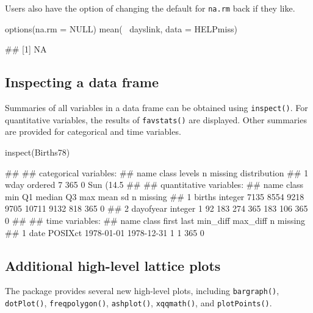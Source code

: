 \noindent
Users also have the option of changing the default for \texttt{na.rm}
back if they like.

\begin{Schunk}
\begin{Sinput}
options(na.rm = NULL)
mean(~ dayslink, data = HELPmiss)
\end{Sinput}
\begin{Soutput}
## [1] NA
\end{Soutput}
\end{Schunk}

\subsection{Inspecting a data frame}\label{inspecting-a-data-frame}

Summaries of all variables in a data frame can be obtained using
\texttt{inspect()}. For quantitative variables, the results of
\texttt{favstats()} are displayed. Other summaries are provided for
categorical and time variables.

\begin{Schunk}
\begin{Sinput}
inspect(Births78)
\end{Sinput}
\begin{Soutput}
## 
## categorical variables:  
##   name   class levels   n missing                                  distribution
## 1 wday ordered      7 365       0 Sun (14.5%
## 
## quantitative variables:  
##        name   class  min   Q1 median   Q3   max mean  sd   n missing
## 1    births integer 7135 8554   9218 9705 10711 9132 818 365       0
## 2 dayofyear integer    1   92    183  274   365  183 106 365       0
## 
## time variables:  
##   name   class      first       last min_diff max_diff   n missing
## 1 date POSIXct 1978-01-01 1978-12-31        1        1 365       0
\end{Soutput}
\end{Schunk}

\subsection{Additional high-level lattice
plots}\label{additional-high-level-lattice-plots}

The  package provides several new high-level 
plots, including \texttt{bargraph()}, \texttt{dotPlot()},
\texttt{freqpolygon()}, \texttt{ashplot()}, \texttt{xqqmath()}, and
\texttt{plotPoints()}.

